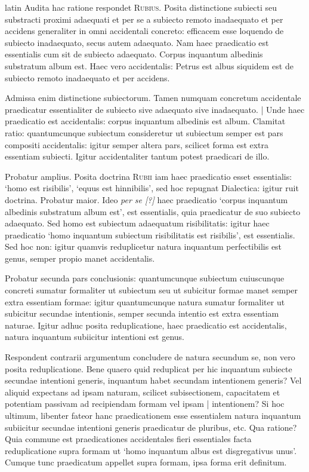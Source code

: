 \begin{otherlanguage*}{latin}
\pstart
Audita hac ratione respondet \textsc{Rubius}. Posita distinctione subiecti seu substracti proximi adaequati et per se a subiecto remoto inadaequato et per accidens generaliter in omni accidentali concreto:
efficacem esse loquendo de subiecto inadaequato, secus autem adaequato. Nam haec praedicatio est essentialis cum sit de subiecto adaequato. Corpus inquantum albedinis substratum album est. Haec vero accidentalis:
Petrus est albus siquidem est de subiecto remoto inadaequato et per accidens. 
\pend

\pstart
Admissa enim distinctione subiectorum. Tamen numquam concretum accidentale praedicatur essentialiter de subiecto sive adaequato sive inadaequato. \textnormal{|} Unde haec praedicatio est accidentalis:
corpus inquantum albedinis est album. Clamitat ratio:
quantumcunque subiectum consideretur ut subiectum semper est pars compositi accidentalis:
igitur semper altera pars, scilicet forma est extra essentiam subiecti. Igitur accidentaliter tantum potest praedicari de illo. 
\pend

\pstart
Probatur amplius. Posita doctrina \textsc{Rubii} iam haec praedicatio esset essentialis:
`homo est risibilis', `equus est hinnibilis', sed hoc repugnat Dialectica:
igitur ruit doctrina. Probatur maior. Ideo \emph{per se [?]} haec praedicatio `corpus inquantum albedinis substratum album est', est essentialis, quia praedicatur de suo subiecto adaequato. Sed homo est subiectum adaequatum risibilitatis:
igitur haec praedicatio `homo inquantum subiectum risibilitatis est risibilis', est essentialis. Sed hoc non:
igitur quamvis reduplicetur natura inquantum perfectibilis est genus, semper propio manet accidentalis. 
\pend

\pstart
Probatur secunda pars conclusionis:
quantumcunque subiectum cuiuscunque concreti sumatur formaliter ut subiectum seu ut subicitur formae manet semper extra essentiam formae:
igitur quantumcunque natura sumatur formaliter ut subicitur secundae intentionis, semper secunda intentio est extra essentiam naturae. Igitur adhuc posita reduplicatione, haec praedicatio est accidentalis, natura inquantum subiicitur intentioni est genus. 
\pend

\pstart
Respondent contrarii argumentum concludere de natura secundum se, non vero posita reduplicatione. Bene quaero quid reduplicat per hic inquantum subiecte secundae intentioni generis, inquantum habet secundam intentionem generis? Vel aliquid expectans ad ipsam naturam, scilicet subisectionem, capacitatem et potentiam passivam ad recipiendam formam vel ipsam \textnormal{|} intentionem? Si hoc ultimum, libenter fateor hanc praedicationem esse essentialem natura inquantum subiicitur secundae intentioni generis praedicatur de pluribus, etc. Qua ratione? Quia commune est praedicationes accidentales fieri essentiales facta reduplicatione supra formam ut `homo inquantum albus est disgregativus unus'. Cumque tunc praedicatum appellet supra formam, ipsa forma erit definitum. 
\pend


\end{otherlanguage*}
